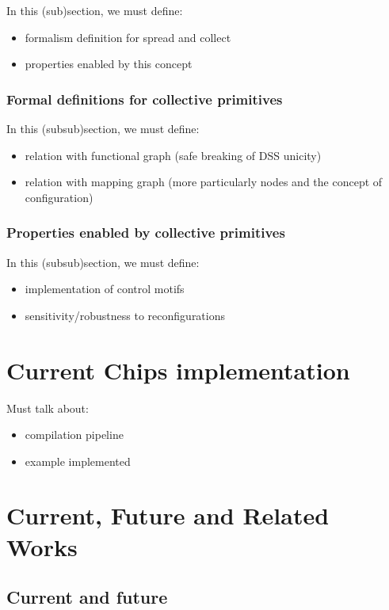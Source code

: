 \documentclass{article}
\begin{document}
In this (sub)section, we must define:
\begin{itemize}
    \item formalism definition for spread and collect
    \item properties enabled by this concept 
\end{itemize}

\subsubsection{Formal definitions for collective primitives}

In this (subsub)section, we must define:
\begin{itemize}
    \item relation with functional graph (safe breaking of DSS unicity)
    \item relation with mapping graph (more particularly nodes and the concept of configuration)
\end{itemize}


\subsubsection{Properties enabled by collective primitives}

In this (subsub)section, we must define:
\begin{itemize}
    \item implementation of control motifs
    \item sensitivity/robustness to reconfigurations
\end{itemize}

\section{Current Chips implementation}
Must talk about:
\begin{itemize}
    \item compilation pipeline
    \item example implemented
\end{itemize}


\section{Current, Future and Related Works}

\subsection{Current and future}
\end{document}
